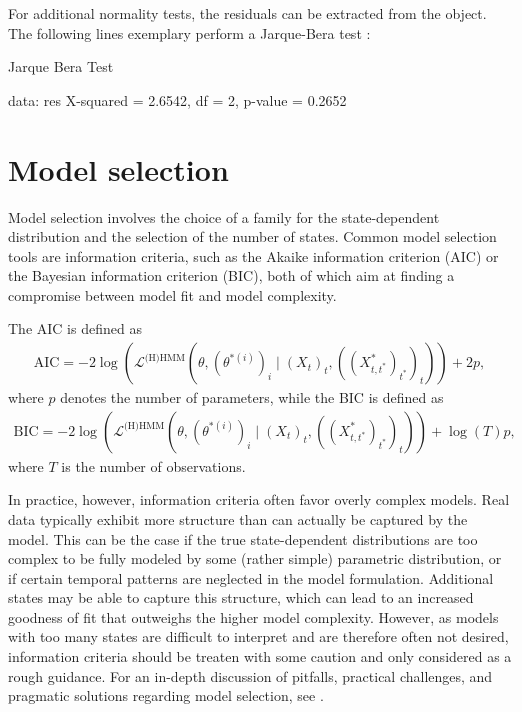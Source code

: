 \documentclass[article]{jss}
\begin{document}
For additional normality tests, the residuals can be extracted from the  object. The following lines exemplary perform a Jarque-Bera test \cite{jar87}:

%
\begin{Schunk}
\begin{Soutput}
	Jarque Bera Test

data:  res
X-squared = 2.6542, df = 2, p-value = 0.2652
\end{Soutput}
\end{Schunk}
%

\section{Model selection} \label{sec:model_selection} %

Model selection involves the choice of a family for the state-dependent distribution and the selection of the number of states. Common model selection tools are information criteria, such as the Akaike information criterion (AIC) or the Bayesian information criterion (BIC), both of which aim at finding a compromise between model fit and model complexity.

The AIC is defined as
\begin{align*}
\text{AIC} = - 2 \log (\mathcal{L}^\text{(H)HMM}(\theta,(\theta^{*(i)})_i\mid (X_t)_t,((X^*_{t,t^*})_{t^*})_t)) + 2 p,
\end{align*}
where $p$ denotes the number of parameters, while the BIC is defined as
\begin{align*}
\text{BIC} = - 2 \log (\mathcal{L}^\text{(H)HMM}(\theta,(\theta^{*(i)})_i\mid (X_t)_t,((X^*_{t,t^*})_{t^*})_t)) + \log(T) p,
\end{align*}
where $T$ is the number of observations.

In practice, however, information criteria often favor overly complex models. Real data typically exhibit more structure than can actually be captured by the model. This can be the case if the true state-dependent distributions are too complex to be fully modeled by some (rather simple) parametric distribution, or if certain temporal patterns are neglected in the model formulation. Additional states may be able to capture this structure, which can lead to an increased goodness of fit that outweighs the higher model complexity. However, as models with too many states are difficult to interpret and are therefore often not desired, information criteria should be treaten with some caution and only considered as a rough guidance. For an in-depth discussion of pitfalls, practical challenges, and pragmatic solutions regarding model selection, see \cite{poh17}.
\end{document}

